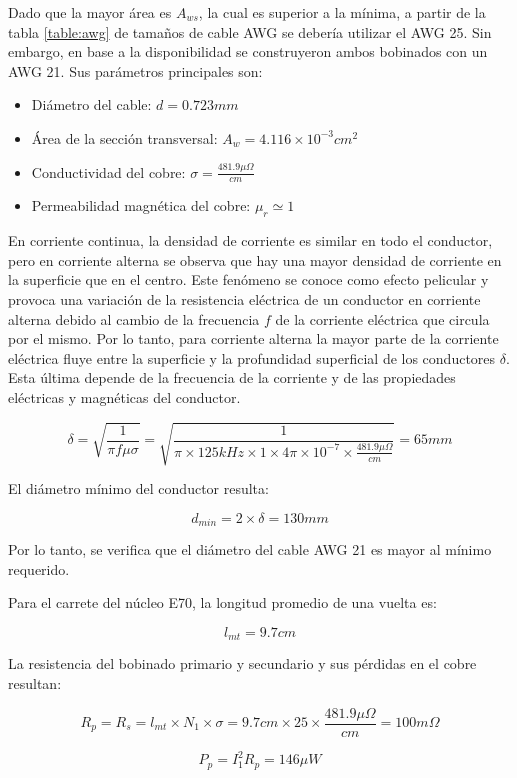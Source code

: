 Dado que la mayor área es $A_{ws}$, la cual es superior a la mínima, a partir de la tabla \ref{table:awg} de tamaños de cable AWG se debería utilizar el AWG 25.
Sin embargo, en base a la disponibilidad se construyeron ambos bobinados con un AWG 21. 
Sus parámetros principales son:

\begin{itemize}
    \item Diámetro del cable: $d=0.723mm$
    \item Área de la sección transversal: $A_{w}=4.116\times10^{-3}cm^2$
    \item Conductividad del cobre: $\sigma=\frac{481.9\mu\Omega}{cm}$
    \item Permeabilidad magnética del cobre: $\mu_r\simeq1$
\end{itemize}

En corriente continua, la densidad de corriente es similar en todo el conductor, pero en corriente alterna se observa que hay una mayor densidad de corriente en la superficie que en el centro. 
Este fenómeno se conoce como efecto pelicular\cite{skin} y provoca una variación de la resistencia eléctrica de un conductor en corriente alterna debido al cambio de la frecuencia $f$ de la corriente eléctrica que circula por el mismo.
Por lo tanto, para corriente alterna la mayor parte de la corriente eléctrica fluye entre la superficie y la profundidad superficial de los conductores $\delta$.
Esta última depende de la frecuencia de la corriente y de las propiedades eléctricas y magnéticas del conductor.

$$ \delta=\sqrt{\frac{1}{\pi f\mu\sigma}}=\sqrt{\frac{1}{\pi\times125kHz\times1\times4\pi\times10^{-7}\times\frac{481.9\mu\Omega}{cm}}}=65mm $$

El diámetro mínimo del conductor resulta:

$$ d_{min}=2\times\delta=130mm$$

Por lo tanto, se verifica que el diámetro del cable AWG 21 es mayor al mínimo requerido. 

Para el carrete del núcleo E70, la longitud promedio de una vuelta es: 

$$ l_{mt}=9.7cm $$

La resistencia del bobinado primario y secundario y sus pérdidas en el cobre resultan:

$$ R_p=R_s=l_{mt}\times N_{1}\times\sigma=9.7cm \times25 \times\frac{481.9\mu\Omega}{cm}=100m\Omega $$

$$ P_p=I_1^2R_p=146\mu W $$

